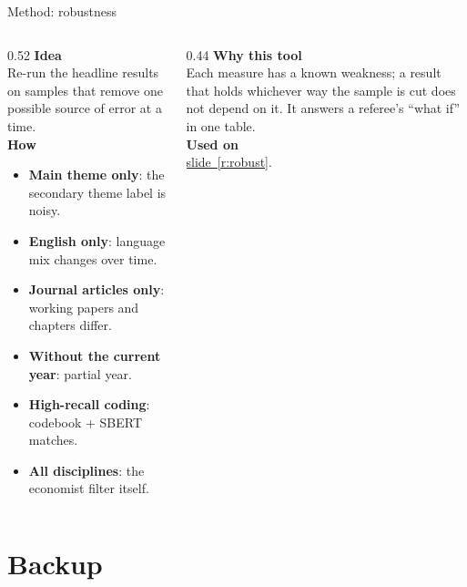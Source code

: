 \documentclass[aspectratio=169,10pt]{beamer}
\newcommand{\usedon}[1]{\hyperref[#1]{\textcolor{c4}{slide~\ref*{#1}}}}
\newcommand{\mhead}[1]{\textcolor{c1}{\textbf{#1}}\\[1pt]}
\begin{document}
\begin{frame}{Method: robustness}
\begin{columns}[T]
\begin{column}{0.52\textwidth}\footnotesize
\mhead{Idea}
Re-run the headline results on samples that remove one possible source of error at a time.\\[4pt]
\mhead{How}
\begin{itemize}\setlength\itemsep{1pt}
\item \textbf{Main theme only}: the secondary theme label is noisy.
\item \textbf{English only}: language mix changes over time.
\item \textbf{Journal articles only}: working papers and chapters differ.
\item \textbf{Without the current year}: partial year.
\item \textbf{High-recall coding}: codebook + SBERT matches.
\item \textbf{All disciplines}: the economist filter itself.
\end{itemize}
\end{column}
\begin{column}{0.44\textwidth}\footnotesize
\mhead{Why this tool}
Each measure has a known weakness; a result that holds whichever way the sample is cut does not depend on it. It answers a referee's ``what if'' in one table.\\[6pt]
\mhead{Used on}
\usedon{r:robust}.
\end{column}
\end{columns}
\end{frame}

\section*{Backup}
\end{document}
